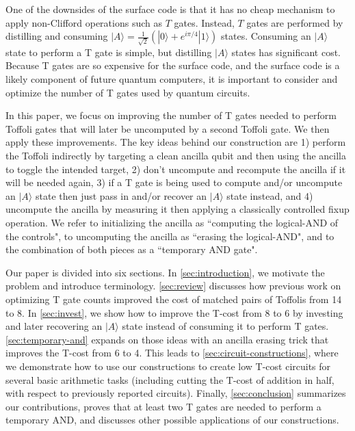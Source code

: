 \documentclass[twocolumn,longbibliography]{quantumarticle-customized}
\begin{document}
One of the downsides of the surface code is that it has no cheap mechanism to apply non-Clifford operations such as $T$ gates.
Instead, $T$ gates are performed by distilling and consuming $|A\rangle = \frac{1}{\sqrt{2}} (|0\rangle + e^{i \pi/4} |1\rangle)$ states.
Consuming an $|A\rangle$ state to perform a T gate is simple, but distilling $|A\rangle$ states has significant cost.
Because T gates are so expensive for the surface code, and the surface code is a likely component of future quantum computers, it is important to consider and optimize the number of T gates used by quantum circuits.

In this paper, we focus on improving the number of T gates needed to perform Toffoli gates that will later be uncomputed by a second Toffoli gate.
We then apply these improvements.
The key ideas behind our construction are 1) perform the Toffoli indirectly by targeting a clean ancilla qubit and then using the ancilla to toggle the intended target, 2) don't uncompute and recompute the ancilla if it will be needed again, 3) if a T gate is being used to compute and/or uncompute an $|A\rangle$ state then just pass in and/or recover an $|A\rangle$ state instead, and 4) uncompute the ancilla by measuring it then applying a classically controlled fixup operation.
We refer to initializing the ancilla as ``computing the logical-AND of the controls", to uncomputing the ancilla as ``erasing the logical-AND", and to the combination of both pieces as a ``temporary AND gate".

Our paper is divided into six sections.
In \autoref{sec:introduction}, we motivate the problem and introduce terminology.
\autoref{sec:review} discusses how previous work on optimizing T gate counts improved the cost of matched pairs of Toffolis from 14 to 8.
In \autoref{sec:invest}, we show how to improve the T-cost from 8 to 6 by investing and later recovering an $|A\rangle$ state instead of consuming it to perform T gates.
\autoref{sec:temporary-and} expands on those ideas with an ancilla erasing trick that improves the T-cost from 6 to 4.
This leads to \autoref{sec:circuit-constructions}, where we demonstrate how to use our constructions to create low T-cost circuits for several basic arithmetic tasks (including cutting the T-cost of addition in half, with respect to previously reported circuits).
Finally, \autoref{sec:conclusion} summarizes our contributions, proves that at least two T gates are needed to perform a temporary AND, and discusses other possible applications of our constructions.
\end{document}
